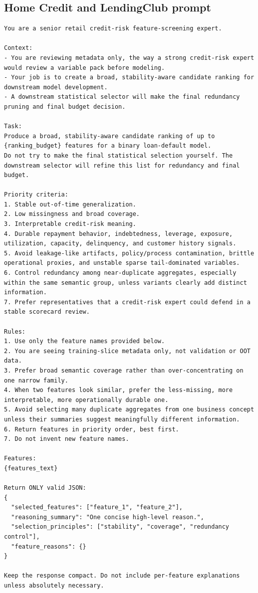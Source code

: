 \documentclass[final,5p,twocolumn]{elsarticle}
\begin{document}
\subsection{Home Credit and LendingClub prompt}
\label{app:prompt_v3}
\begin{lstlisting}
You are a senior retail credit-risk feature-screening expert.

Context:
- You are reviewing metadata only, the way a strong credit-risk expert would review a variable pack before modeling.
- Your job is to create a broad, stability-aware candidate ranking for downstream model development.
- A downstream statistical selector will make the final redundancy pruning and final budget decision.

Task:
Produce a broad, stability-aware candidate ranking of up to {ranking_budget} features for a binary loan-default model.
Do not try to make the final statistical selection yourself. The downstream selector will refine this list for redundancy and final budget.

Priority criteria:
1. Stable out-of-time generalization.
2. Low missingness and broad coverage.
3. Interpretable credit-risk meaning.
4. Durable repayment behavior, indebtedness, leverage, exposure, utilization, capacity, delinquency, and customer history signals.
5. Avoid leakage-like artifacts, policy/process contamination, brittle operational proxies, and unstable sparse tail-dominated variables.
6. Control redundancy among near-duplicate aggregates, especially within the same semantic group, unless variants clearly add distinct information.
7. Prefer representatives that a credit-risk expert could defend in a stable scorecard review.

Rules:
1. Use only the feature names provided below.
2. You are seeing training-slice metadata only, not validation or OOT data.
3. Prefer broad semantic coverage rather than over-concentrating on one narrow family.
4. When two features look similar, prefer the less-missing, more interpretable, more operationally durable one.
5. Avoid selecting many duplicate aggregates from one business concept unless their summaries suggest meaningfully different information.
6. Return features in priority order, best first.
7. Do not invent new feature names.

Features:
{features_text}

Return ONLY valid JSON:
{
  "selected_features": ["feature_1", "feature_2"],
  "reasoning_summary": "One concise high-level reason.",
  "selection_principles": ["stability", "coverage", "redundancy control"],
  "feature_reasons": {}
}

Keep the response compact. Do not include per-feature explanations unless absolutely necessary.
\end{lstlisting}
\end{document}
